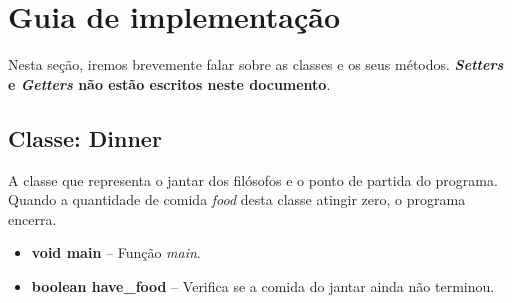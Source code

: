 \documentclass[11pt]{article}
\begin{document}
\section{Guia de implementação}

Nesta seção, iremos brevemente falar sobre as classes e os seus métodos. \textbf{\textit{Setters} e \textit{Getters} não estão escritos neste documento}.

\subsection{Classe: Dinner}
A classe que representa o jantar dos filósofos e o ponto de partida do programa. Quando a quantidade de comida \textit{food} desta classe atingir zero, o programa encerra. 
\begin{itemize}
	\item \textbf{\textcolor{sblue}{void} main} -- Função \textit{main}.
	\item \textbf{\textcolor{sblue}{boolean} have\_food} -- Verifica se a comida do jantar ainda não terminou.
\end{itemize}
\end{document}
